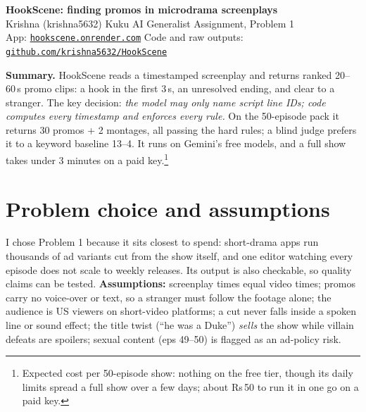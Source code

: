 \documentclass[10pt]{article}
\begin{document}
\begin{center}
{\Large\bfseries HookScene: finding promos in microdrama screenplays}\\[4pt]
Krishna (krishna5632) \textperiodcentered{} Kuku AI Generalist Assignment, Problem 1\\[1pt]
{\small App: \href{https://hookscene.onrender.com/}{\texttt{hookscene.onrender.com}}
\quad Code and raw outputs: \href{https://github.com/krishna5632/HookScene}{\texttt{github.com/krishna5632/HookScene}}}
\end{center}

\textbf{Summary.} HookScene reads a timestamped screenplay and returns ranked 20--60\,s promo clips: a hook in the
first 3\,s, an unresolved ending, and clear to a stranger. The key decision: \emph{the model may only name script line IDs;
code computes every timestamp and enforces every rule.} On the 50-episode pack it returns 30 promos + 2 montages,
all passing the hard rules; a blind judge prefers it to a keyword baseline 13--4. It runs on Gemini's free models, and
a full show takes under 3 minutes on a paid key.\footnote{Expected cost per 50-episode show: nothing on the free tier,
though its daily limits spread a full show over a few days; about Rs\,50 to run it in one go on a paid key.}

\section{Problem choice and assumptions}
I chose Problem 1 because it sits closest to spend: short-drama apps run thousands of ad variants cut from the show
itself, and one editor watching every episode does not scale to weekly releases. Its output is also checkable, so
quality claims can be tested. \textbf{Assumptions:} screenplay times equal video times; promos carry no voice-over or
text, so a stranger must follow the footage alone; the audience is US viewers on short-video platforms; a cut never
falls inside a spoken line or sound effect; the title twist (``he was a Duke'') \emph{sells} the show while villain
defeats are spoilers; sexual content (eps 49--50) is flagged as an ad-policy risk.
\end{document}

